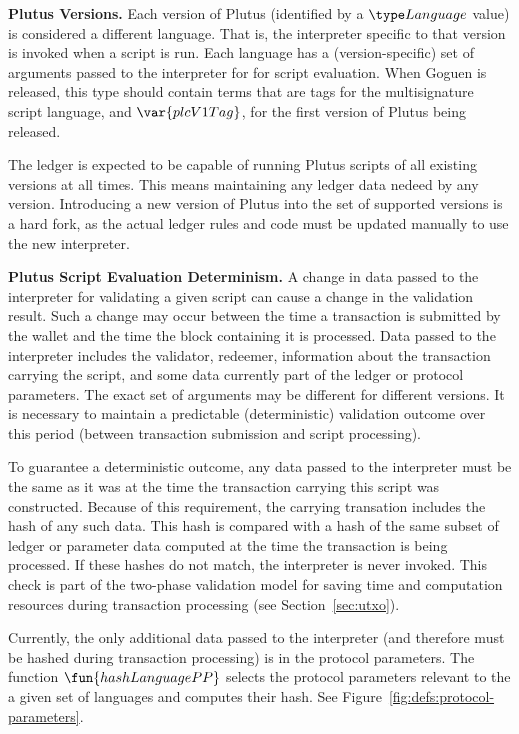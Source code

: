 \textbf{Plutus Versions.} Each
version of Plutus (identified by a $\Language$ value) is considered a different
language. That is, the interpreter
specific to that version is invoked when a script is run. Each language
has a (version-specific) set of arguments passed to the interpreter for
for script evaluation. When Goguen is released, this type should contain
terms that are tags for the multisignature script language, and $\var{plcV1Tag}$,
for the first version of Plutus being released.

The ledger is expected to be capable of running Plutus scripts of
all existing versions at all times. This means maintaining any ledger
data nedeed by any version. Introducing a new version of Plutus
into the set of supported versions is a hard fork, as the actual ledger rules
and code must be updated manually to use the new interpreter.

\textbf{Plutus Script Evaluation Determinism.}
A change in data passed to the interpreter for
validating a given script can cause a change in the validation result. Such
a change may occur between the time a transaction is submitted by the wallet
and the time the block containing it is processed. Data passed to the interpreter
includes the validator, redeemer, information about the transaction carrying
the script, and some data currently part of the ledger or protocol parameters.
The exact set of arguments may be different for different versions.
It is necessary to maintain a predictable
(deterministic) validation outcome over this period (between transaction
submission and script processing).

To guarantee a deterministic outcome,
any data passed to the interpreter must be
the same as it was at the time the transaction carrying this script was
constructed.
Because of this requirement, the carrying transation includes the hash of any such data.
This hash is compared with
a hash of the same subset of ledger or parameter data computed at the time the transaction is being
processed. If these hashes do not match, the interpreter is never invoked.
This check is part of the two-phase validation model for saving time and computation
resources during transaction processing (see Section~\ref{sec:utxo}).

Currently, the only additional data passed to the interpreter (and therefore must
be hashed during transaction processing) is in the protocol parameters. The
function $\fun{hashLanguagePP}$ selects the protocol parameters relevant to
the a given set of languages and computes their hash.
See Figure~\ref{fig:defs:protocol-parameters}.

